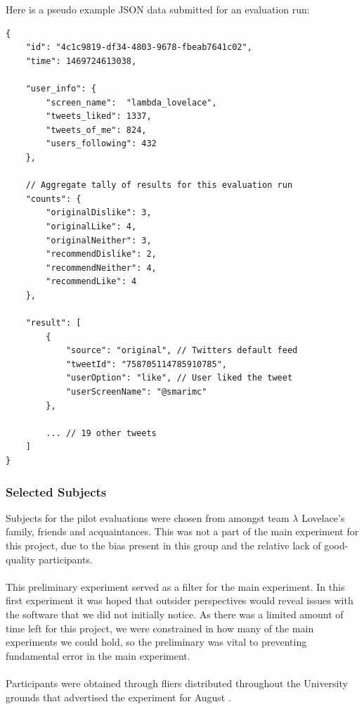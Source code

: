 \documentclass{article}
\begin{document}
\begin{samepage}
\noindent Here is a pseudo example JSON data submitted for an evaluation run:
\begin{verbatim}
{
    "id": "4c1c9819-df34-4803-9678-fbeab7641c02",
    "time": 1469724613038,
    
    "user_info": {
        "screen_name":  "lambda_lovelace",
        "tweets_liked": 1337,
        "tweets_of_me": 824,
        "users_following": 432
    },

    // Aggregate tally of results for this evaluation run
    "counts": {
        "originalDislike": 3,
        "originalLike": 4,
        "originalNeither": 3,
        "recommendDislike": 2,
        "recommendNeither": 4,
        "recommendLike": 4
    },
    
    "result": [
        {
            "source": "original", // Twitters default feed
            "tweetId": "758705114785910785",
            "userOption": "like", // User liked the tweet
            "userScreenName": "@smarimc"
        },
        
        ... // 19 other tweets
    ]
}
\end{verbatim}
\end{samepage}

\subsubsection*{Selected Subjects} %
%
%
Subjects for the pilot evaluations were chosen from amongst team $\lambda$ Lovelace's family, friends and acquaintances. This was not a part of the main experiment for this project, due to the bias present in this group and the relative lack of good-quality participants.
\\\\
This preliminary experiment served as a filter for the main experiment. In this first experiment it was hoped that outsider perspectives would reveal issues with the software that we did not initially notice. As there was a limited amount of time left for this project, we were constrained in how many of the main experiments we could hold, so the preliminary was vital to preventing fundamental error in the main experiment. 
\\\\
Participants were obtained through fliers distributed throughout the University grounds that advertised the experiment for August . 
\end{document}
